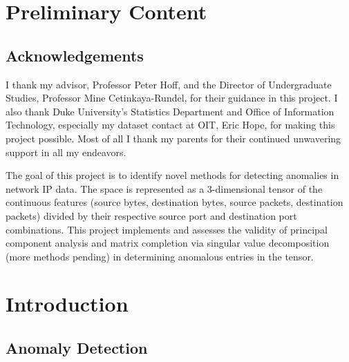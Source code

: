 \documentclass[12pt,twoside]{dukestatscithesis}
\title{}
\author{}
\date{}
\theoremstyle{definition}
\theoremstyle{definition}
\theoremstyle{definition}
\theoremstyle{remark}
\begin{document}

\frontmatter %
\pagestyle{empty} %



  \hypersetup{linkcolor=black}
  \setcounter{tocdepth}{2}
  \tableofcontents





\mainmatter %
\pagestyle{fancyplain} %

\chapter*{Preliminary Content}\label{preliminary-content}

\section*{Acknowledgements}\label{acknowledgements}

I thank my advisor, Professor Peter Hoff, and the Director of
Undergraduate Studies, Professor Mine Cetinkaya-Rundel, for their
guidance in this project. I also thank Duke University's Statistics
Department and Office of Information Technology, especially my dataset
contact at OIT, Eric Hope, for making this project possible. Most of all
I thank my parents for their continued unwavering support in all my
endeavors.

The goal of this project is to identify novel methods for detecting
anomalies in network IP data. The space is represented as a
3-dimensional tensor of the continuous features (source bytes,
destination bytes, source packets, destination packets) divided by their
respective source port and destination port combinations. This project
implements and assesses the validity of principal component analysis and
matrix completion via singular value decomposition (more methods
pending) in determining anomalous entries in the tensor.

\chapter{Introduction}\label{introduction}

\section{Anomaly Detection}\label{anomaly-detection}
\end{document}
